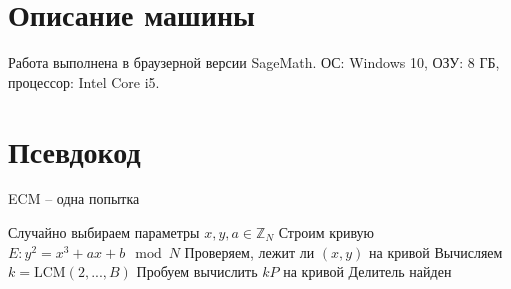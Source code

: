 \documentclass[12pt,a4paper]{article}
\begin{document}
\section*{Описание машины}
Работа выполнена в браузерной версии SageMath. ОС: Windows 10, ОЗУ: 8 ГБ, процессор: Intel Core i5.

\section*{Псевдокод}
\begin{algorithm}[H]
\caption{ECM – одна попытка}
\begin{algorithmic}[1]
\State Случайно выбираем параметры $x, y, a \in \mathbb{Z}_N$
\State Строим кривую $E: y^2 = x^3 + ax + b \mod N$
\State Проверяем, лежит ли $(x, y)$ на кривой
\State Вычисляем $k = \text{LCM}(2, ..., B)$
\State Пробуем вычислить $kP$ на кривой
  \State Делитель найден
\EndIf
\end{algorithmic}
\end{algorithm}
\end{document}
